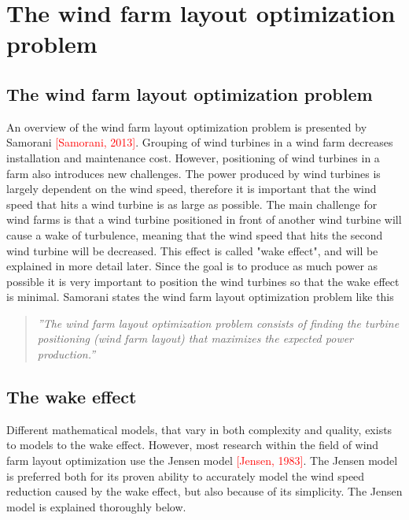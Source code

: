 \documentclass{article}
\begin{document}
\section{The wind farm layout optimization problem}




\subsection{The wind farm layout optimization problem}


An overview of the wind farm layout optimization problem is presented by Samorani \textcolor{red}{[Samorani, 2013]}. Grouping of wind turbines in a wind farm decreases installation and maintenance cost. However, positioning of wind turbines in a farm also introduces new challenges. The power produced by wind turbines is largely dependent on the wind speed, therefore it is important that the wind speed that hits a wind turbine is as large as possible. The main challenge for wind farms is that a wind turbine positioned in front of another wind turbine will cause a wake of turbulence, meaning that the wind speed that hits the second wind turbine will be decreased. This effect is called "wake effect", and will be explained in more detail later. Since the goal is to produce as much power as possible it is very important to position the wind turbines so that the wake effect is minimal. Samorani states the wind farm layout optimization problem like this


\begin{quote}
\textit{''The wind farm layout optimization problem consists of finding the turbine positioning (wind farm layout) that maximizes the expected power production.''}
\end{quote}


\subsection{The wake effect}


Different mathematical models, that vary in both complexity and quality, exists to models to the wake effect. However, most research within the field of wind farm layout optimization use the Jensen model \textcolor{red}{[Jensen, 1983]}. The Jensen model is preferred both for its proven ability to accurately model the wind speed reduction caused by the wake effect, but also because of its simplicity. The Jensen model is explained thoroughly below.
\end{document}
